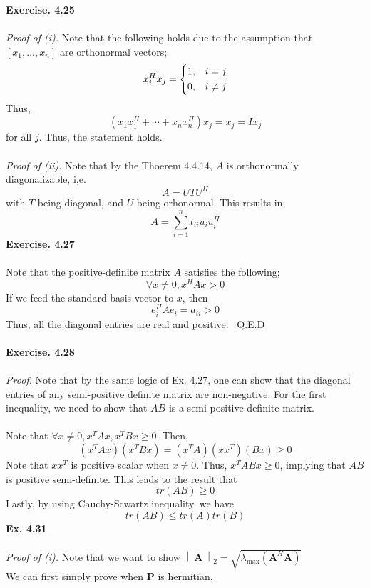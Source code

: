 \documentclass[letterpaper,12pt]{article}
\theoremstyle{definition}
\begin{document}
\textbf{Exercise. 4.25}\\\\
\emph{Proof of (i).} Note that the following holds due to the assumption that $[x_1, ..., x_n]$ are orthonormal vectors;
\[
x_{i}^H x_{j}=
\begin{dcases}
1, & i=j \\
0, & i \neq j
\end{dcases}
\]
Thus,
\[(x_1 x_{1}^H + \cdots + x_n x_{n}^H) x_j = x_j = I x_j  \]
for all $j$. Thus, the statement holds. \\\\
\emph{Proof of (ii). } Note that by the Thoerem 4.4.14, $A$ is orthonormally diagonalizable, i,e.
\[ A = U T U^H\]
with $T$ being diagonal, and $U$ being orhonormal. This results in;\\
\[A = \sum_{i=1}^{n} t_{ii} u_i u_{i}^{H}\]
\textbf{Exercise. 4.27}\\\\
Note that the positive-definite matrix $A$ satisfies the following; \\
\[ \forall x \neq 0, x^H A x > 0\]
If we feed the standard basis vector to $x$, then \\
\[e_{i}^{H} A e_{i} = a_{ii} > 0 \]
Thus, all the diagonal entries are real and positive. \ Q.E.D \\\\
\textbf{Exercise. 4.28}\\\\
\emph{Proof.} Note that by the same logic of Ex. 4.27, one can show that the diagonal entries of any semi-positive definite matrix are non-negative. For the first inequality, we need to show that $AB$ is a semi-positive definite matrix.\\\\
Note that $\forall x \neq 0, x^T A x, x^T B x  \geq 0 $. Then,
\[(x^T A x) (x^T B x) = (x^T A)(x x^T) (Bx) \geq 0\]
Note that $x x^T$ is positive scalar when $x \neq 0$. Thus, $x^T AB x \geq 0$, implying that $AB$ is positive semi-definite. This leads to the result that
\[ tr(AB) \geq 0 \]
Lastly, by using Cauchy-Scwartz inequality, we have
\[tr(AB) \leq tr(A) tr(B) \]
\newline
\textbf{Ex. 4.31}\\\\
\emph{Proof of (i).} Note that we want to show $\left\| \mathbf{A}\right\|_2 = \sqrt{\lambda_{\max}(\mathbf{A}^H \mathbf{A})}$ \\
We can first simply prove when $\mathbf{P}$ is hermitian, \\
\end{document}
